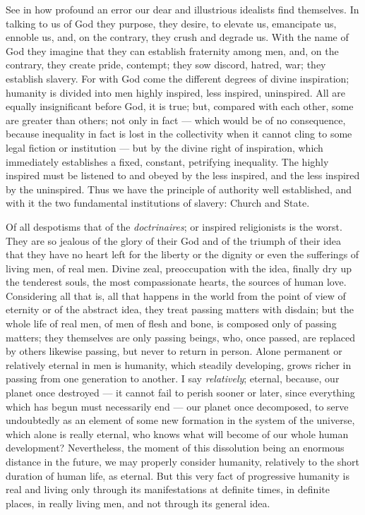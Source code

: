 \documentclass[12pt]{report}
\begin{document}
See in how profound an error our dear and illustrious idealists find themselves. In talking to us of God they purpose, they desire, to elevate us, emancipate us, ennoble us, and, on the contrary, they crush and degrade us. With the name of God they imagine that they can establish fraternity among men, and, on the contrary, they create pride, contempt; they sow discord, hatred, war; they establish slavery. For with God come the different degrees of divine inspiration; humanity is divided into men highly inspired, less inspired, uninspired. All are equally insignificant before God, it is true; but, compared with each other, some are greater than others; not only in fact — which would be of no consequence, because inequality in fact is lost in the collectivity when it cannot cling to some legal fiction or institution — but by the divine right of inspiration, which immediately establishes a fixed, constant, petrifying inequality. The highly inspired must be listened to and obeyed by the less inspired, and the less inspired by the uninspired. Thus we have the principle of authority well established, and with it the two fundamental institutions of slavery: Church and State.


Of all despotisms that of the \emph{doctrinaires}; or inspired religionists is the worst. They are so jealous of the glory of their God and of the triumph of their idea that they have no heart left for the liberty or the dignity or even the sufferings of living men, of real men. Divine zeal, preoccupation with the idea, finally dry up the tenderest souls, the most compassionate hearts, the sources of human love. Considering all that is, all that happens in the world from the point of view of eternity or of the abstract idea, they treat passing matters with disdain; but the whole life of real men, of men of flesh and bone, is composed only of passing matters; they themselves are only passing beings, who, once passed, are replaced by others likewise passing, but never to return in person. Alone permanent or relatively eternal in men is humanity, which steadily developing, grows richer in passing from one generation to another. I say \emph{relatively}; eternal, because, our planet once destroyed — it cannot fail to perish sooner or later, since everything which has begun must necessarily end — our planet once decomposed, to serve undoubtedly as an element of some new formation in the system of the universe, which alone is really eternal, who knows what will become of our whole human development? Nevertheless, the moment of this dissolution being an enormous distance in the future, we may properly consider humanity, relatively to the short duration of human life, as eternal. But this very fact of progressive humanity is real and living only through its manifestations at definite times, in definite places, in really living men, and not through its general idea.
\end{document}
